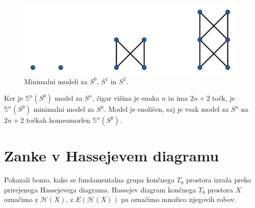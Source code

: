 \documentclass[mat1]{fmfdelo}
\DeclareRobustCommand{\h}{
    \mathcal{H}}
\newcommand{\Sus}{\mathbb S}
\begin{document}
\begin{figure}[h]
    \centering
    \includegraphics[width=0.8\linewidth]{sfere.png}
    \caption{Minimalni modeli za $S^0$, $S^1$ in $S^2$.}
\end{figure}

Ker je $\Sus^n(S^0)$ model za $S^n$, čigar višina je enaka $n$ in ima 
$2n+2$ točk, je $\Sus^n(S^0)$ minimalni model za $S^n$. Model je 
enoličen, saj je vsak model za $S^n$ na $2n+2$ točkah homeomorfen 
$\Sus^n(S^0)$.
\section{Zanke v Hassejevem diagramu}\label{sec:hasse}

Pokazali bomo, kako se fundamentalna grupa končnega $T_0$ 
prostora izraža preko prirejenega Hassejevega diagrama.
Hassejev diagram končnega $T_0$ prostora $X$ označimo z 
$\h(X)$, z $E(\h(X))$ pa označimo množico njegovih robov.
\end{document}
